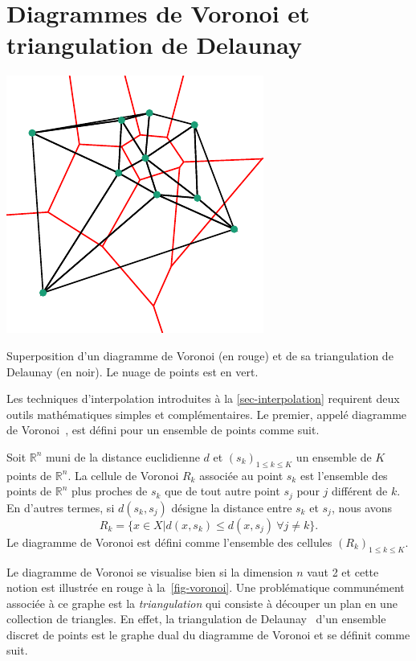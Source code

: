             \section{Diagrammes de Voronoi et triangulation de Delaunay}\label{abstr-voronoi-delaunay}
        
        \begin{marginfigure}
            \centering
            \includegraphics[]{img/chapitre2/figure3/Voronoi.pdf}
            \caption{Superposition d'un diagramme de Voronoi (en rouge) et de sa triangulation de Delaunay (en noir). Le nuage de points est en vert.}
            \label{fig-voronoi}
        \end{marginfigure}
        Les techniques d'interpolation introduites à la \cref{sec-interpolation} requirent deux outils mathématiques simples et complémentaires. Le premier, appelé diagramme de Voronoi~\cite{cazals2006delaunay}, est défini pour un ensemble de points comme suit.
        \begin{mydef}
            Soit $\mathbb{R}^n$ muni de la distance euclidienne $d$ et $(s_k)_{1\leq k\leq K}$ un ensemble de $K$ points de $\mathbb{R}^n$. La cellule de Voronoi $R_k$ associée au point $s_k$ est l'ensemble des points de $\mathbb{R}^n$ plus proches de $s_k$ que de tout autre point $s_j$ pour $j$ différent de $k$. En d'autres termes, si $d(s_k, s_j)$ désigne la distance entre $s_k$ et $s_j$, nous avons
            \[R_k=\{x\in X | d(x, s_k) \leq d(x, s_j) \ \forall j\neq k\}.\]
            Le diagramme de Voronoi est défini comme l'ensemble des cellules $(R_k)_{1\leq k\leq K}$.
        \end{mydef}
        Le diagramme de Voronoi se visualise bien si la dimension $n$ vaut 2 et cette notion est illustrée en rouge à la~\cref{fig-voronoi}. Une problématique communément associée à ce graphe est la \emph{triangulation} qui consiste à découper un plan en une collection de triangles. En effet, la triangulation de Delaunay~\cite{cazals2006delaunay} d'un ensemble discret de points est le graphe dual du diagramme de Voronoi et se définit comme suit.
